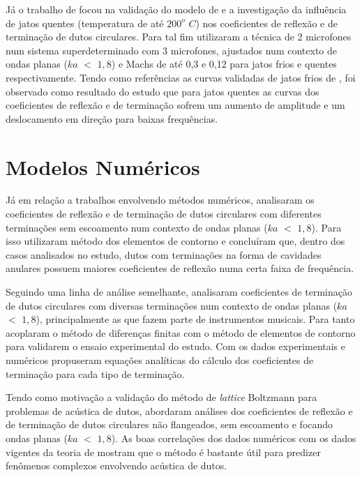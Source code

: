 Já o trabalho de  focou na validação do modelo de  e a investigação da influência de jatos quentes (temperatura de até $200^{o}$ $C$) nos coeficientes de reflexão e de terminação de dutos circulares. Para tal fim utilizaram a técnica de 2 microfones num sistema superdeterminado com 3 microfones, ajustados num contexto de ondas planas ($ka$ $<$ $1,8$) e Machs de até 0,3 e 0,12 para jatos frios e quentes respectivamente. Tendo como referências as curvas validadas de jatos frios de , foi observado como resultado do estudo que para jatos quentes as curvas dos coeficientes de reflexão e de terminação sofrem um aumento de amplitude e um deslocamento em direção para baixas frequências.


\section{Modelos Numéricos}

Já em relação a trabalhos envolvendo métodos numéricos,  analisaram os coeficientes de reflexão e de terminação de dutos circulares com diferentes terminações sem escoamento num contexto de ondas planas ($ka$ $<$ $1,8$). Para isso utilizaram método dos elementos de contorno e concluíram que, dentro dos casos analisados no estudo, dutos com terminações na forma de cavidades anulares possuem maiores coeficientes de reflexão numa certa faixa de frequência.

Seguindo uma linha de análise semelhante,  analisaram coeficientes de terminação de dutos circulares com diversas terminações num contexto de ondas planas ($ka$ $<$ $1,8$), principalmente as que fazem parte de instrumentos musicais. Para tanto acoplaram o método de diferenças finitas com o método de elementos de contorno para validarem o ensaio experimental do estudo. Com os dados experimentais e numéricos propuseram equações analíticas do cálculo dos coeficientes de terminação para cada tipo de terminação.

Tendo como motivação a validação do método de \textit{lattice} Boltzmann para problemas de acústica de dutos,  abordaram análises dos coeficientes de reflexão e de terminação de dutos circulares não flangeados, sem escoamento e focando ondas planas ($ka$ $<$ $1,8$). As boas correlações dos dados numéricos com os dados vigentes da teoria de  mostram que o método é bastante útil para predizer fenômenos complexos envolvendo acústica de dutos.

